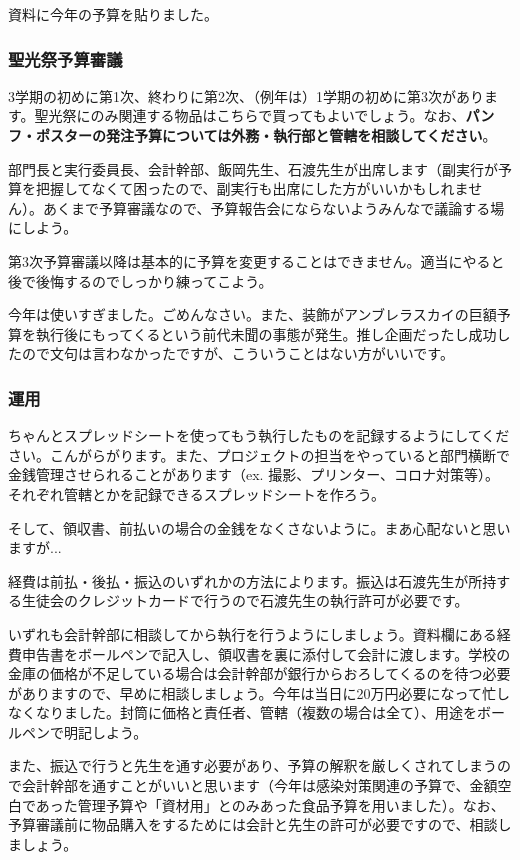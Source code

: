 \documentclass[dvipdfmx,jb5]{jarticle}
\begin{document}
資料に今年の予算を貼りました。

\subsubsection{聖光祭予算審議}
3学期の初めに第1次、終わりに第2次、（例年は）1学期の初めに第3次があります。聖光祭にのみ関連する物品はこちらで買ってもよいでしょう。なお、{\bf パンフ・ポスターの発注予算については外務・執行部と管轄を相談してください}。

部門長と実行委員長、会計幹部、飯岡先生、石渡先生が出席します（副実行が予算を把握してなくて困ったので、副実行も出席にした方がいいかもしれません）。あくまで予算審議なので、予算報告会にならないようみんなで議論する場にしよう。

第3次予算審議以降は基本的に予算を変更することはできません。適当にやると後で後悔するのでしっかり練ってこよう。

今年は使いすぎました。ごめんなさい。また、装飾がアンブレラスカイの巨額予算を執行後にもってくるという前代未聞の事態が発生。推し企画だったし成功したので文句は言わなかったですが、こういうことはない方がいいです。

\subsubsection{運用}
ちゃんとスプレッドシートを使ってもう執行したものを記録するようにしてください。こんがらがります。また、プロジェクトの担当をやっていると部門横断で金銭管理させられることがあります（ex. 撮影、プリンター、コロナ対策等）。それぞれ管轄とかを記録できるスプレッドシートを作ろう。

そして、領収書、前払いの場合の金銭をなくさないように。まあ心配ないと思いますが...

経費は前払・後払・振込のいずれかの方法によります。振込は石渡先生が所持する生徒会のクレジットカードで行うので石渡先生の執行許可が必要です。

いずれも会計幹部に相談してから執行を行うようにしましょう。資料欄にある経費申告書をボールペンで記入し、領収書を裏に添付して会計に渡します。学校の金庫の価格が不足している場合は会計幹部が銀行からおろしてくるのを待つ必要がありますので、早めに相談しましょう。今年は当日に20万円必要になって忙しなくなりました。封筒に価格と責任者、管轄（複数の場合は全て）、用途をボールペンで明記しよう。

また、振込で行うと先生を通す必要があり、予算の解釈を厳しくされてしまうので会計幹部を通すことがいいと思います（今年は感染対策関連の予算で、金額空白であった管理予算や「資材用」とのみあった食品予算を用いました）。なお、予算審議前に物品購入をするためには会計と先生の許可が必要ですので、相談しましょう。
\end{document}
